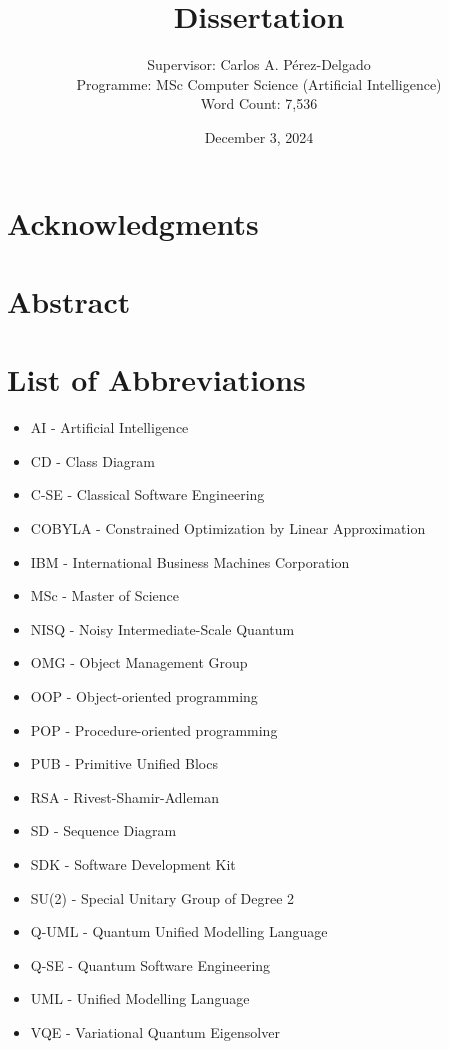 \documentclass{article}
\title{Dissertation}
\author{Supervisor: Carlos A. Pérez-Delgado\\ Programme: MSc Computer Science (Artificial Intelligence) \\ Word Count: 7,536}
\date{December 3, 2024}
\begin{document}
\maketitle

\thispagestyle{empty} %

\newpage
\setcounter{page}{1}

\section*{Acknowledgments}
\newpage

\section*{Abstract}
\newpage

\listoffigures
\newpage

\listoftables
\newpage

\section*{List of Abbreviations}
\begin{itemize}
    \item AI - Artificial Intelligence
    \item CD - Class Diagram
    \item C-SE - Classical Software Engineering
    \item COBYLA - Constrained Optimization by Linear Approximation
    \item IBM - International Business Machines Corporation
    \item MSc - Master of Science
    \item NISQ - Noisy Intermediate-Scale Quantum
    \item OMG - Object Management Group
    \item OOP - Object-oriented programming
    \item POP - Procedure-oriented programming
    \item PUB - Primitive Unified Blocs
    \item RSA - Rivest-Shamir-Adleman
    \item SD - Sequence Diagram
    \item SDK - Software Development Kit
    \item SU(2) - Special Unitary Group of Degree 2
    \item Q-UML - Quantum Unified Modelling Language
    \item Q-SE - Quantum Software Engineering
    \item UML - Unified Modelling Language
    \item VQE - Variational Quantum Eigensolver
\end{itemize}
\newpage
\end{document}
